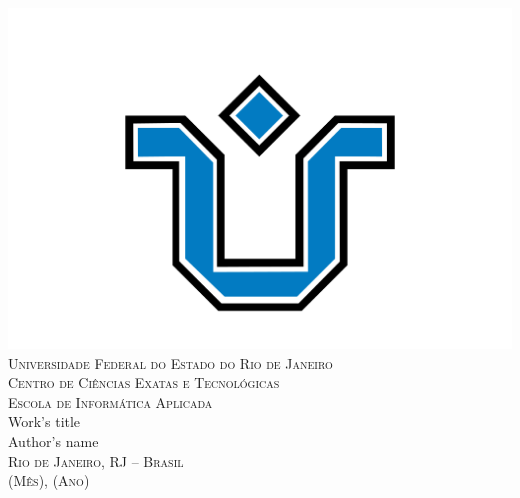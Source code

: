 \documentclass[a4paper, 12pt]{article}
\begin{document}
\setcounter{page}{1}
\thispagestyle{empty}
    \begin{center}
        \includegraphics[scale=0.18]{unirio.png}\\
        \fontsize{13}{15}
        \textsc{
        Universidade Federal do Estado do Rio de Janeiro\\
        Centro de Ciências Exatas e Tecnológicas\\
        Escola de Informática Aplicada\\}
        \vspace{2.8cm}
        Work's title\\
            
        \vspace{2.8cm}
        Author's name
        \vspace*{\fill}\\
        
        \textsc{Rio de Janeiro, RJ -- Brasil\\
        (Mês), (Ano)}
    \end{center}
    \clearpage
\end{document}
